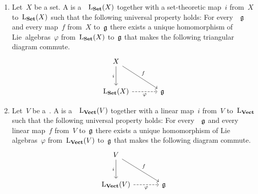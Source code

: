 \begin{definition}
	\leavevmode
	\begin{enumerate}
		\item
			Let~$X$ be a set.
			A  is a~\liealgebra{$\kf$}~$\operatorname{L}_{\mathbf{Set}}(X)$ together with a set-theoretic map~$i$ from~$X$ to~$\operatorname{L}_{\mathbf{Set}}(X)$ such that the following universal property holds:
			For every~\liealgebra{$\kf$}~$\mathfrak{g}$ and every map~$f$ from~$X$ to~$\mathfrak{g}$ there exists a unique homomorphism of Lie~algebras~$\varphi$ from~$\operatorname{L}_{\mathbf{Set}}(X)$ to~$\mathfrak{g}$ that makes the following triangular diagram commute.
			\[
				\begin{tikzcd}[sep = large]
					X
					\arrow{dr}[above right]{f}
					\arrow{d}[left]{i}
					&
					{}
					\\
					\freelieset(X)
					\arrow[dashed]{r}[below]{\varphi}
					&
					\glie
				\end{tikzcd}
			\]
		\item
			Let~$V$ be a~\vectorspace{$\kf$}.
			A  is a~\liealgebra{$\kf$}~$\operatorname{L}_{\mathbf{Vect}}(V)$ together with a linear map~$i$ from~$V$ to~$\operatorname{L}_{\mathbf{Vect}}$ such that the following universal property holds:
			For every~\liealgebra{$\kf$}~$\mathfrak{g}$ and every linear map~$f$ from~$V$ to~$\mathfrak{g}$ there exists a unique homomorphism of Lie algebras~$\varphi$ from~$\operatorname{L}_{\mathbf{Vect}}(V)$ to~$\mathfrak{g}$ that makes the following diagram commute.
			\[
				\begin{tikzcd}[sep = large]
					V
					\arrow{dr}[above right]{f}
					\arrow{d}[left]{i}
					&
					{}
					\\
					\freelievect(V)
					\arrow[dashed]{r}[below]{\varphi}
					&
					\glie
				\end{tikzcd}
			\]
	\end{enumerate}
\end{definition}


